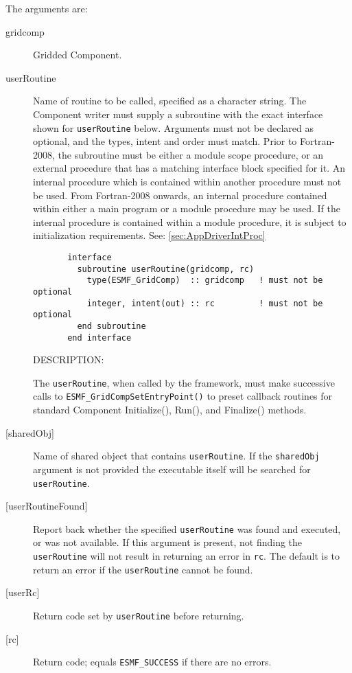    The arguments are:
   \begin{description}
   \item[gridcomp]
     Gridded Component.
   \item[userRoutine]
     Name of routine to be called, specified as a character string.
     The Component writer must supply a subroutine with the exact interface
     shown for {\tt userRoutine} below. Arguments must not be declared
     as optional, and the types, intent and order must match.
     Prior to Fortran-2008, the subroutine must be either a module scope procedure,
     or an external procedure that has a matching interface block specified for it.
     An internal procedure which is contained within another procedure must not be used.
     From Fortran-2008 onwards, an internal procedure contained within either a main program
     or a module procedure may be used.  If the internal procedure is contained within a
     module procedure, it is subject to initialization requirements.  See: \ref{sec:AppDriverIntProc}
  
\begin{verbatim}       interface
         subroutine userRoutine(gridcomp, rc)
           type(ESMF_GridComp)  :: gridcomp   ! must not be optional
           integer, intent(out) :: rc         ! must not be optional
         end subroutine
       end interface\end{verbatim}
{\sf DESCRIPTION:\\ }


     \begin{sloppypar}
     The {\tt userRoutine}, when called by the framework, must make successive calls
     to {\tt ESMF\_GridCompSetEntryPoint()} to preset callback routines for
     standard Component Initialize(), Run(), and Finalize() methods.
     \end{sloppypar}
   \item[{[sharedObj]}]
     Name of shared object that contains {\tt userRoutine}. If the
     {\tt sharedObj} argument is not provided the executable itself will be
     searched for {\tt userRoutine}.
   \item[{[userRoutineFound]}]
     Report back whether the specified {\tt userRoutine} was found and executed,
     or was not available. If this argument is present, not finding the
     {\tt userRoutine} will not result in returning an error in {\tt rc}.
     The default is to return an error if the {\tt userRoutine} cannot be found.
   \item[{[userRc]}]
     Return code set by {\tt userRoutine} before returning.
   \item[{[rc]}]
     Return code; equals {\tt ESMF\_SUCCESS} if there are no errors.
   \end{description}
   
